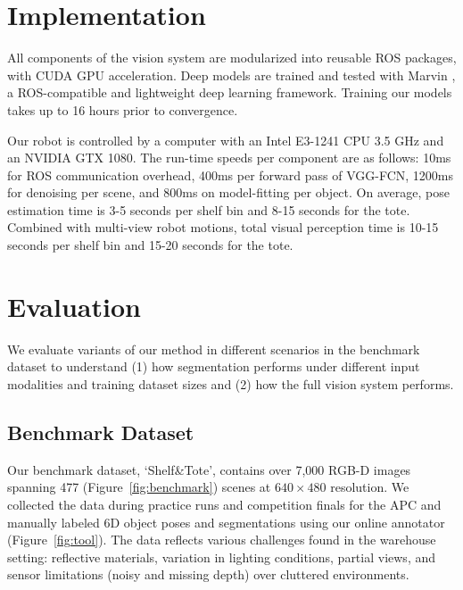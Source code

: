 \documentclass[letterpaper, 10 pt, conference]{ieeeconf}  %
\newcommand{\figref}[1]{Figure~\ref{#1}}
\begin{document}
\section{Implementation} %
All components of the vision system are modularized into reusable ROS packages, with CUDA GPU acceleration. Deep models are trained and tested with Marvin \cite{Marvin20151110}, a ROS-compatible and lightweight deep learning framework. Training our models takes up to 16 hours prior to convergence. %

Our robot is controlled by a computer with an Intel E3-1241 CPU 3.5 GHz and an NVIDIA GTX 1080. The run-time speeds per component are as follows: 10ms for ROS communication overhead, 400ms per forward pass of VGG-FCN, 1200ms for denoising per scene, and 800ms on model-fitting per object. On average, pose estimation time is 3-5 seconds per shelf bin and 8-15 seconds for the tote. Combined with multi-view robot motions, total visual perception time is 10-15 seconds per shelf bin and 15-20 seconds for the tote.

\section{Evaluation}
We evaluate variants of our method in different scenarios in the benchmark dataset to understand (1) how segmentation performs under different input modalities and training dataset sizes and (2) how the full vision system performs.



\subsection{Benchmark Dataset}
\label{ref:benchmark}
Our benchmark dataset, `Shelf\&Tote', contains over 7,000 RGB-D images spanning 477 (\figref{fig:benchmark}) scenes at $640\times{480}$ resolution. We collected the data during practice runs and competition finals for the APC and manually labeled 6D object poses and segmentations using our online annotator (\figref{fig:tool}). The data reflects various challenges found in the warehouse setting: reflective materials, variation in lighting conditions, partial views, and sensor limitations (noisy and missing depth) over cluttered environments.
\end{document}
